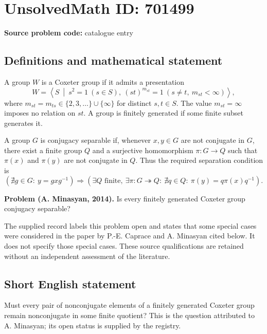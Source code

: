 \documentclass[11pt]{article}
\begin{document}
\section*{UnsolvedMath ID: 701499}
\textbf{Source problem code:} catalogue entry
\subsection{Definitions and mathematical statement}
A group \(W\) is a Coxeter group if it admits a presentation
\[
W=\left\langle S\ \middle|\ s^2=1\ (s\in S),\ (st)^{m_{st}}=1\ (s\ne t,\ m_{st}<\infty)\right\rangle,
\]
where \(m_{st}=m_{ts}\in\{2,3,\ldots\}\cup\{\infty\}\) for distinct \(s,t\in S\). The value \(m_{st}=\infty\) imposes no relation on \(st\). A group is finitely generated if some finite subset generates it.

A group \(G\) is conjugacy separable if, whenever \(x,y\in G\) are not conjugate in \(G\), there exist a finite group \(Q\) and a surjective homomorphism \(\pi:G\to Q\) such that \(\pi(x)\) and \(\pi(y)\) are not conjugate in \(Q\). Thus the required separation condition is
\[
\left(\nexists g\in G:\ y=gxg^{-1}\right)
\Longrightarrow
\left(\exists Q\text{ finite},\ \exists\pi:G\twoheadrightarrow Q:\
\nexists q\in Q:\ \pi(y)=q\pi(x)q^{-1}\right).
\]

\textbf{Problem (A. Minasyan, 2014).} Is every finitely generated Coxeter group conjugacy separable?

The supplied record labels this problem open and states that some special cases were considered in the paper by P.-E. Caprace and A. Minasyan cited below. It does not specify those special cases. These source qualifications are retained without an independent assessment of the literature.
\subsection{Short English statement}
Must every pair of nonconjugate elements of a finitely generated Coxeter group remain nonconjugate in some finite quotient? This is the question attributed to A. Minasyan; its open status is supplied by the registry.
\end{document}
